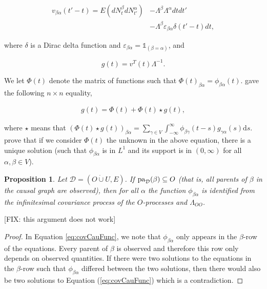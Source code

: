 \documentclass[accepted]{uai2021} %
\newcommand{\md}{\mathrm{d}}
\newtheorem{prop}[thm]{Proposition}
\newcommand{\pa}{\textnormal{pa}}
\newcommand{\disjU}{\mathbin{\dot{\cup}}}
\begin{document}
\begin{align}
	v_{\beta\alpha}(t' - t) = E(dN_t^\beta dN_{t'}^\alpha) & - 
	\Lambda^\beta\Lambda^\alpha dt dt' \nonumber \\ & - \Lambda^\beta 
	\varepsilon_{\beta\alpha}
	\delta(t'-t) dt,
	\label{eq:infv}
\end{align}

where $\delta$ is a Dirac delta function and $\varepsilon_{\beta\alpha} = 
\mathds{1}_{(\beta=\alpha)}$, and

$$
g(t) = v^T(t)\Lambda^{-1}.
$$

We let $\Phi(t)$ denote the matrix of functions such that 
$\Phi(t)_{\beta\alpha} = 
\phi_{\beta\alpha}(t)$. \cite{hawkesJRSSB1971} gave the following $n\times n$ 
equality,

\begin{align}
	g(t) = \Phi(t) + \Phi(t) \star g(t),
	\label{eq:covCauFunc}
\end{align}

where $\star$ means that $(\Phi(t) \star g(t))_{\beta\alpha} = \sum_{\gamma \in 
V} 
\int_{-\infty}^{\infty} \phi_{\beta\gamma}(t - s) g_{\gamma\alpha}(s) \md s$. 
\cite{bacry2016} 
prove that if we consider $\Phi(t)$ 
the 
unknown in the above equation, there is a unique solution (such that 
$\phi_{\beta\alpha}$ is in $L^1$ and its support is in $(0,\infty)$ for all 
$\alpha,\beta\in V$).

\begin{prop}
	Let $\mathcal{D} = (O\disjU U, E)$. If $\pa_\mathcal{D}(\beta) \subseteq 
	O$ (that is, all parents of $\beta$ in the causal graph are observed), then 
	for all $\alpha$ the function $\phi_{\beta\alpha}$ is identified 
	from 
	the infinitesimal covariance process of the $O$-processes and 
	$\Lambda_{OO}$.
	\label{prop:gPaId}
\end{prop}

[FIX: this argument does not work]

\begin{proof}
	In Equation \ref{eq:covCauFunc}, we note that $\phi_{\beta\alpha}$ only 
	appears in the $\beta$-row of the equations. Every parent of $\beta$ is 
	observed and therefore this row only depends on observed quantities. If 
	there were two solutions to the equations in the $\beta$-row such that 
	$\phi_{\beta\alpha}$ differed between the two solutions, then there would 
	also 
	be two solutions to Equation (\ref{eq:covCauFunc}) which is a contradiction.
\end{proof}
\end{document}
